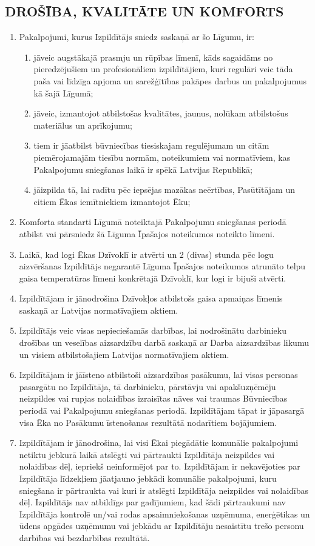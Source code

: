 \begin{multicols}{2}
\subsection{DROŠĪBA, KVALITĀTE UN KOMFORTS}
\begin{enumerate}
	\item Pakalpojumi, kurus Izpildītājs sniedz saskaņā ar šo Līgumu, ir:
	\begin{enumerate}
		\item jāveic augstākajā prasmju un rūpības līmenī, kāds sagaidāms no pieredzējušiem un profesionāliem izpildītājiem, kuri regulāri veic tāda paša vai līdzīga apjoma un sarežģītības pakāpes darbus un pakalpojumus kā šajā Līgumā;
		\item jāveic, izmantojot atbilstošas kvalitātes, jaunus, nolūkam atbilstošus materiālus un aprīkojumu;
		\item tiem ir jāatbilst būvniecības tiesiskajam regulējumam un citām piemērojamajām tiesību normām, noteikumiem vai normatīviem, kas Pakalpojumu sniegšanas laikā ir spēkā Latvijas Republikā;
		\item jāizpilda  tā, lai radītu pēc iepsējas mazākas neērtības, Pasūtītājam un citiem Ēkas iemītniekiem izmantojot Ēku;
	\end{enumerate}
	\item Komforta standarti Līgumā noteiktajā Pakalpojumu sniegšanas periodā atbilst vai pārsniedz šā Līguma Īpašajos noteikumos noteikto līmeni.
	\item Laikā, kad logi Ēkas Dzīvoklī ir atvērti un 2 (divas) stunda pēc logu aizvēršanas Izpildītājs negarantē Līguma Īpašajos noteikumos atrunāto telpu gaisa temperatūras līmeni konkrētajā Dzīvoklī, kur logi ir bijuši atvērti.
	\item Izpildītājam ir jānodrošina Dzīvokļos atbilstošs gaisa apmaiņas līmenis saskaņā ar Latvijas normatīvajiem aktiem.
	\item Izpildītājs veic visas nepieciešamās darbības, lai nodrošinātu darbinieku drošības un veselības aizsardzību darbā saskaņā ar Darba aizsardzības likumu un visiem atbilstošajiem Latvijas normatīvajiem aktiem.
	\item Izpildītājam ir jāīsteno atbilstoši aizsardzības pasākumu, lai visas personas pasargātu no Izpildītāja, tā darbinieku, pārstāvju vai apakšuzņēmēju neizpildes vai rupjas nolaidības izraisītas nāves vai traumas Būvniecības periodā vai Pakalpojumu sniegšanas periodā. Izpildītājam tāpat ir jāpasargā visa Ēka no Pasākumu īstenošanas rezultātā nodarītiem bojājumiem.
	\item Izpildītājam ir jānodrošina, lai visi Ēkai piegādātie komunālie pakalpojumi netiktu jebkurā laikā atslēgti vai pārtraukti Izpildītāja neizpildes vai nolaidības dēļ, iepriekš neinformējot par to. Izpildītājam ir nekavējoties par Izpildītāja līdzekļiem jāatjauno jebkādi komunālie pakalpojumi, kuru sniegšana ir pārtraukta vai kuri ir atslēgti Izpildītāja neizpildes vai nolaidības dēļ. Izpildītājs nav atbildīgs par gadījumiem, kad šādi pārtraukumi nav Izpildītāja kontrolē un/vai rodas apsaimniekošanas uzņēmuma, enerģētikas un ūdens apgādes uzņēmumu vai jebkādu ar Izpildītāju nesaistītu trešo personu darbības vai bezdarbības rezultātā.

\end{enumerate}
\end{multicols}
